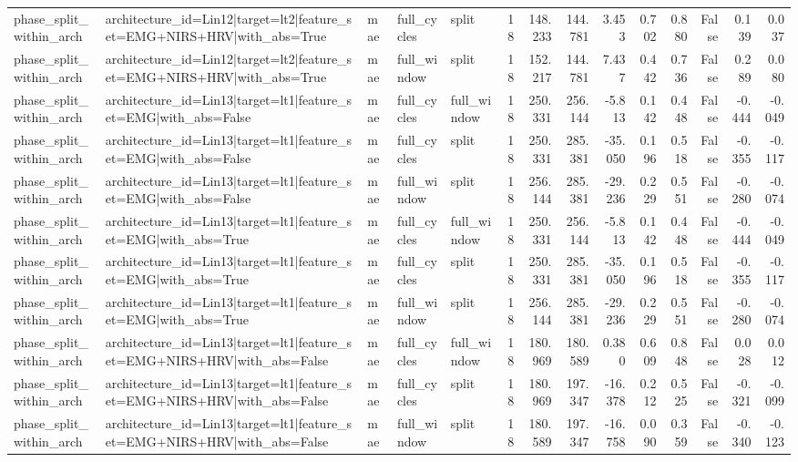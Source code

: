 \begin{table}
\begin{tabular}{lllllrrrrrrrrr}
phase_split_within_arch & architecture_id=Lin12|target=lt2|feature_set=EMG+NIRS+HRV|with_abs=True & mae & full_cycles & split & 18 & 148.233 & 144.781 & 3.453 & 0.702 & 0.880 & False & 0.139 & 0.037 \\
phase_split_within_arch & architecture_id=Lin12|target=lt2|feature_set=EMG+NIRS+HRV|with_abs=True & mae & full_window & split & 18 & 152.217 & 144.781 & 7.437 & 0.442 & 0.736 & False & 0.289 & 0.080 \\
phase_split_within_arch & architecture_id=Lin13|target=lt1|feature_set=EMG|with_abs=False & mae & full_cycles & full_window & 18 & 250.331 & 256.144 & -5.813 & 0.142 & 0.448 & False & -0.444 & -0.049 \\
phase_split_within_arch & architecture_id=Lin13|target=lt1|feature_set=EMG|with_abs=False & mae & full_cycles & split & 18 & 250.331 & 285.381 & -35.050 & 0.196 & 0.518 & False & -0.355 & -0.117 \\
phase_split_within_arch & architecture_id=Lin13|target=lt1|feature_set=EMG|with_abs=False & mae & full_window & split & 18 & 256.144 & 285.381 & -29.236 & 0.229 & 0.551 & False & -0.280 & -0.074 \\
phase_split_within_arch & architecture_id=Lin13|target=lt1|feature_set=EMG|with_abs=True & mae & full_cycles & full_window & 18 & 250.331 & 256.144 & -5.813 & 0.142 & 0.448 & False & -0.444 & -0.049 \\
phase_split_within_arch & architecture_id=Lin13|target=lt1|feature_set=EMG|with_abs=True & mae & full_cycles & split & 18 & 250.331 & 285.381 & -35.050 & 0.196 & 0.518 & False & -0.355 & -0.117 \\
phase_split_within_arch & architecture_id=Lin13|target=lt1|feature_set=EMG|with_abs=True & mae & full_window & split & 18 & 256.144 & 285.381 & -29.236 & 0.229 & 0.551 & False & -0.280 & -0.074 \\
phase_split_within_arch & architecture_id=Lin13|target=lt1|feature_set=EMG+NIRS+HRV|with_abs=False & mae & full_cycles & full_window & 18 & 180.969 & 180.589 & 0.380 & 0.609 & 0.848 & False & 0.028 & 0.012 \\
phase_split_within_arch & architecture_id=Lin13|target=lt1|feature_set=EMG+NIRS+HRV|with_abs=False & mae & full_cycles & split & 18 & 180.969 & 197.347 & -16.378 & 0.212 & 0.525 & False & -0.321 & -0.099 \\
phase_split_within_arch & architecture_id=Lin13|target=lt1|feature_set=EMG+NIRS+HRV|with_abs=False & mae & full_window & split & 18 & 180.589 & 197.347 & -16.758 & 0.090 & 0.359 & False & -0.340 & -0.123 \\

\end{tabular}
\end{table}
